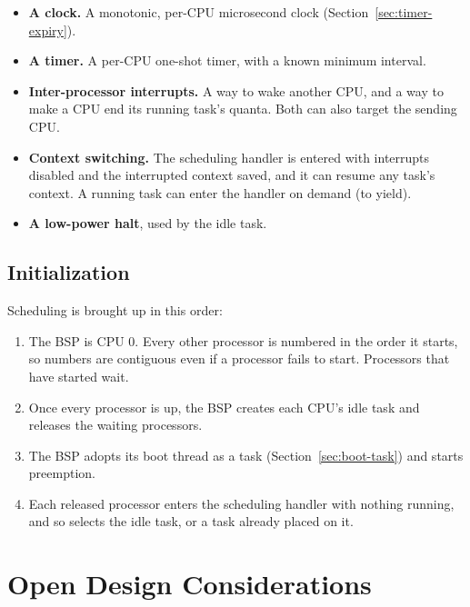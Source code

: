 \documentclass[11pt]{article}
\begin{document}
\begin{itemize}
	\item \textbf{A clock.} A monotonic, per-CPU microsecond clock (Section~\ref{sec:timer-expiry}).
	\item \textbf{A timer.} A per-CPU one-shot timer, with a known minimum interval.
	\item \textbf{Inter-processor interrupts.} A way to wake another CPU, and a way to make a CPU end its running task's quanta. Both can also target the sending CPU.
	\item \textbf{Context switching.} The scheduling handler is entered with interrupts disabled and the interrupted context saved, and it can resume any task's context. A running task can enter the handler on demand (to yield).
	\item \textbf{A low-power halt}, used by the idle task.
\end{itemize}

\subsection{Initialization}

Scheduling is brought up in this order:

\begin{enumerate}
	\item The BSP is CPU 0. Every other processor is numbered in the order it starts, so numbers are contiguous even if a processor fails to start. Processors that have started wait.
	\item Once every processor is up, the BSP creates each CPU's idle task and releases the waiting processors.
	\item The BSP adopts its boot thread as a task (Section~\ref{sec:boot-task}) and starts preemption.
	\item Each released processor enters the scheduling handler with nothing running, and so selects the idle task, or a task already placed on it.
\end{enumerate}

\appendix


\section{Open Design Considerations}
\label{sec:considerations}
\end{document}
